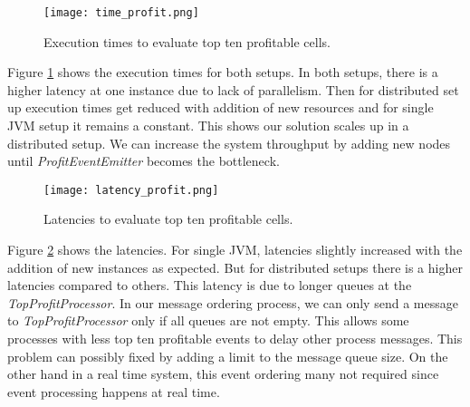 \begin{figure}[!t]
        \centering
        \texttt{[image: time\_profit.png]}
        \caption{Execution times to evaluate top ten profitable cells.}
        \label{time_profit}
\end{figure}
 
Figure \ref{time_profit} shows the execution times for both setups. In both setups, there is a higher latency at one instance due to lack of parallelism. Then for distributed set up execution times get reduced with addition of new resources and for single JVM setup it remains a constant. This shows our solution scales up in a distributed setup. We can increase the system throughput by adding new nodes until \textit{ProfitEventEmitter} becomes the bottleneck.


\begin{figure}[!t]
        \centering
        \texttt{[image: latency\_profit.png]}
        \caption{Latencies to evaluate top ten profitable cells.}
        \label{latency_profit}
\end{figure}

Figure \ref{latency_profit} shows the latencies. For single JVM, latencies slightly increased with the addition of new instances as expected. But for distributed setups there is a higher latencies compared to others. This latency is due to longer queues at the \textit{TopProfitProcessor}. In our message ordering process, we can only send a message to \textit{TopProfitProcessor} only if all queues are not empty. This allows some processes with less top ten profitable events to delay other process messages. This problem can  possibly fixed by adding a limit to the message queue size. On the other hand in a real time system, this event ordering many not required since event processing happens at real time. 



